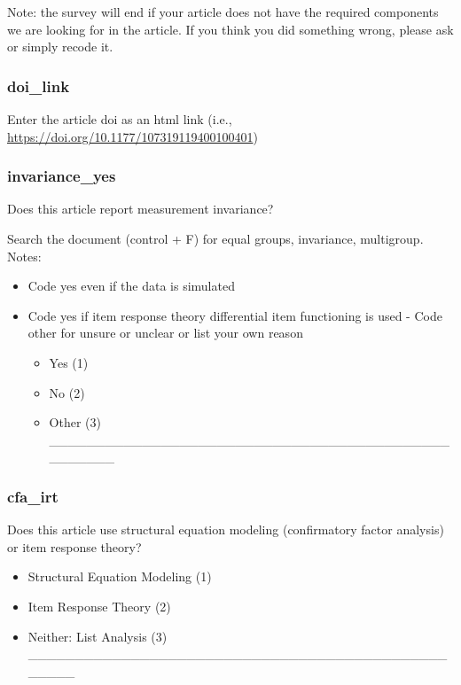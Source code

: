 \documentclass[
  man]{apa7}
\providecommand{\tightlist}{%
  \setlength{\itemsep}{0pt}\setlength{\parskip}{0pt}}
\begin{document}
Note: the survey will end if your article does not have the required components we are looking for in the article. If you think you did something wrong, please ask or simply recode it.

\subsubsection{doi\_link}\label{doi_link}

Enter the article doi as an html link (i.e., \url{https://doi.org/10.1177/107319119400100401})

\subsubsection{invariance\_yes}\label{invariance_yes}

Does this article report measurement invariance?

Search the document (control + F) for equal groups, invariance, multigroup. Notes:

\begin{itemize}
\item
  Code yes even if the data is simulated
\item
  Code yes if item response theory differential item functioning is used - Code other for unsure or unclear or list your own reason

  \begin{itemize}
  \tightlist
  \item
    Yes (1)
  \item
    No (2)
  \item
    Other (3) \_\_\_\_\_\_\_\_\_\_\_\_\_\_\_\_\_\_\_\_\_\_\_\_\_\_\_\_\_\_\_\_\_\_\_\_\_\_\_\_\_\_\_\_\_\_\_\_\_\_
  \end{itemize}
\end{itemize}

\subsubsection{cfa\_irt}\label{cfa_irt}

Does this article use structural equation modeling (confirmatory factor analysis) or item response theory?

\begin{itemize}
\tightlist
\item
  Structural Equation Modeling (1)
\item
  Item Response Theory (2)
\item
  Neither: List Analysis (3) \_\_\_\_\_\_\_\_\_\_\_\_\_\_\_\_\_\_\_\_\_\_\_\_\_\_\_\_\_\_\_\_\_\_\_\_\_\_\_\_\_\_\_\_\_\_\_\_\_\_
\end{itemize}
\end{document}
